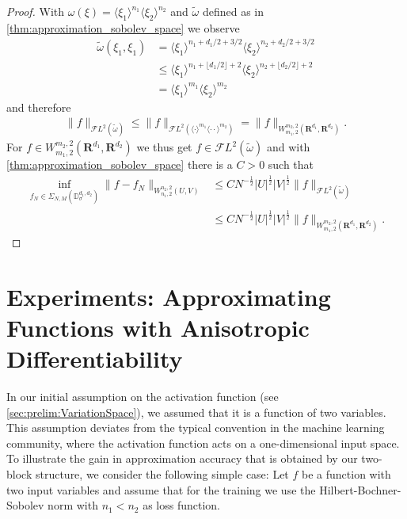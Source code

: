 \documentclass[a4paper]{article}
\newcommand{\rr}[1]{\mathbf{R}^{#1}}
\newcommand{\rrI}{\rr{d_1}}
\newcommand{\rrII}{\rr{d_2}}
\newcommand{\eabs}[1]{\langle #1\rangle}     %
\newcommand{\abs}[1]{| #1|}     %
\newcommand{\norm}[2]{\|#1\|_{#2}}
\newcommand{\F}[0]{\mathscr{F}}
\newcommand{\FL}[1]{\F L^{#1}}
\numberwithin{equation}{section}
\theoremstyle{remark}
\begin{document}
\begin{proof}
    With $\omega(\xi)=\eabs{\xi_1}^{n_1}\eabs{\xi_2}^{n_2}$ and $\tilde{\omega}$ defined as in \cref{thm:approximation_sobolev_space} we observe
    \begin{align*}
        \tilde{\omega}(\xi_1,\xi_1)
        &=\eabs{\xi_1}^{n_1+d_1/2+3/2}\eabs{\xi_2}^{n_2+d_2/2+3/2}\\
        &\leq\eabs{\xi_1}^{n_1+\lfloor d_1/2\rfloor+2}\eabs{\xi_2}^{n_2+\lfloor d_2/2\rfloor+2}\\
        &=\eabs{\xi_1}^{m_1}\eabs{\xi_2}^{m_2}
    \end{align*}
    and therefore
    \begin{align*}
        \norm{f}{\FL{2}(\tilde{\omega})}
        \leq \norm{f}{\FL{2}(\eabs{\cdot}^{m_1}\eabs{\cdot\cdot}^{m_2})}
        =\norm{f}{W_{m_1,2}^{m_2,2}(\rrI, \rrII)}.
    \end{align*}
    For
    $f\in
    W_{m_1,2}^{m_2,2}(\rrI, \rrII)
    $
    we thus get
    $f\in
    \FL{2}(\tilde{\omega})
    $
    and with \cref{thm:approximation_sobolev_space} there is a $C>0$ such that
    \begin{align*}
        \inf_{f_{N}\in\Sigma_{N,M}(\mathbb{D}_\sigma^{d_1,d_2})}\norm{f-f_N}{W_{n_1,2}^{n_2,2}(U,V)}
        &\leq C N^{-\frac{1}{2}} \abs{U}^{\frac{1}{2}} \abs{V}^{\frac{1}{2}}
        \norm{f}{\FL{2}(\tilde{\omega})}\\
        &\leq C N^{-\frac{1}{2}} \abs{U}^{\frac{1}{2}} \abs{V}^{\frac{1}{2}}
        \norm{f}{W_{m_1,2}^{m_2,2}(\rrI, \rrII)}.
    \end{align*}
\end{proof}

\section{Experiments: Approximating Functions with Anisotropic Differentiability}
\label{sec:experiments}

In our initial assumption on the activation function (see \cref{sec:prelim:VariationSpace}),
we assumed that it is a function of two variables.
This assumption deviates from the typical convention
in the machine learning community,
where the activation function acts on a one-dimensional input space.
To illustrate the gain in approximation accuracy
that is obtained by our two-block structure,
we consider the following simple case:
Let $f$ be a function with two input variables
and assume that for the training we use
the Hilbert-Bochner-Sobolev norm with $n_1<n_2$ as loss function.
\end{document}
